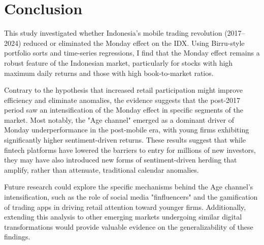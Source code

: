 \documentclass[
	a4paper,
	10pt,
	twoside,
]{LTJournalArticle}
\begin{document}

\section{Conclusion}

This study investigated whether Indonesia's mobile trading revolution (2017--2024) reduced or eliminated the Monday effect on the IDX. Using Birru-style portfolio sorts and time-series regressions, I find that the Monday effect remains a robust feature of the Indonesian market, particularly for stocks with high maximum daily returns and those with high book-to-market ratios. 

Contrary to the hypothesis that increased retail participation might improve efficiency and eliminate anomalies, the evidence suggests that the post-2017 period saw an intensification of the Monday effect in specific segments of the market. Most notably, the "Age channel" emerged as a dominant driver of Monday underperformance in the post-mobile era, with young firms exhibiting significantly higher sentiment-driven returns. These results suggest that while fintech platforms have lowered the barriers to entry for millions of new investors, they may have also introduced new forms of sentiment-driven herding that amplify, rather than attenuate, traditional calendar anomalies.

Future research could explore the specific mechanisms behind the Age channel's intensification, such as the role of social media "finfluencers" and the gamification of trading apps in driving retail attention toward younger firms. Additionally, extending this analysis to other emerging markets undergoing similar digital transformations would provide valuable evidence on the generalizability of these findings.




\end{document}
